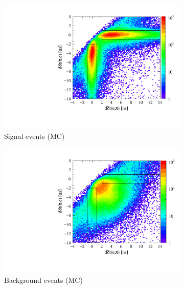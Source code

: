 \begin{figure}[h!]
  \captionsetup[subfigure]{justification=centering}
  \centering
  \begin{subfigure}{0.45\textwidth}
    \includegraphics[width=1.0\textwidth]{Chapter7_analysis_kloe/img/t2/t2_tof1_signal}
    \caption{Signal events (MC)}
  \end{subfigure}
  \begin{subfigure}{0.45\textwidth}
    \includegraphics[width=1.0\textwidth]{Chapter7_analysis_kloe/img/t2/t2_tof1_background}
    \caption{Background events (MC)}
  \end{subfigure}
  \begin{subfigure}{0.45\textwidth}

\end{subfigure}
\end{figure}
